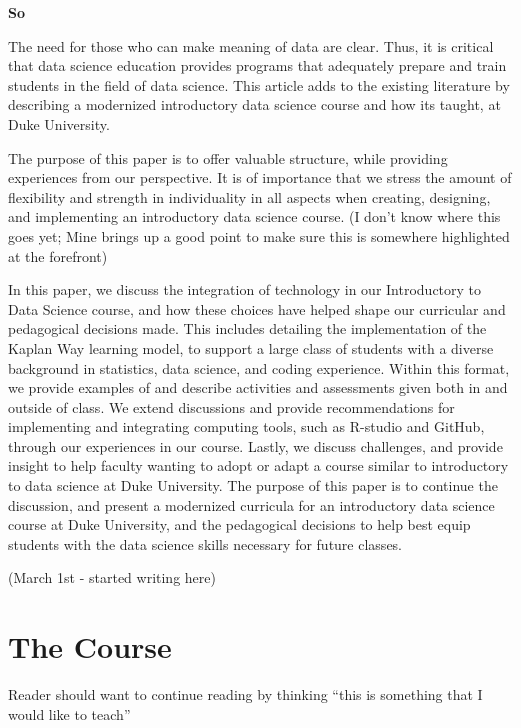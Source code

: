 \documentclass[
  12pt]{article}
\begin{document}
\textbf{So}

The need for those who can make meaning of data are clear. Thus, it is
critical that data science education provides programs that adequately
prepare and train students in the field of data science. This article
adds to the existing literature by describing a modernized introductory
data science course and how its taught, at Duke University.

The purpose of this paper is to offer valuable structure, while
providing experiences from our perspective. It is of importance that we
stress the amount of flexibility and strength in individuality in all
aspects when creating, designing, and implementing an introductory data
science course. (I don't know where this goes yet; Mine brings up a good
point to make sure this is somewhere highlighted at the forefront)

In this paper, we discuss the integration of technology in our
Introductory to Data Science course, and how these choices have helped
shape our curricular and pedagogical decisions made. This includes
detailing the implementation of the Kaplan Way learning model, to
support a large class of students with a diverse background in
statistics, data science, and coding experience. Within this format, we
provide examples of and describe activities and assessments given both
in and outside of class. We extend discussions and provide
recommendations for implementing and integrating computing tools, such
as R-studio and GitHub, through our experiences in our course. Lastly,
we discuss challenges, and provide insight to help faculty wanting to
adopt or adapt a course similar to introductory to data science at Duke
University. The purpose of this paper is to continue the discussion, and
present a modernized curricula for an introductory data science course
at Duke University, and the pedagogical decisions to help best equip
students with the data science skills necessary for future classes.

(March 1st - started writing here)

\hypertarget{sec-course}{%
\section{The Course}\label{sec-course}}

Reader should want to continue reading by thinking ``this is something
that I would like to teach''
\end{document}
